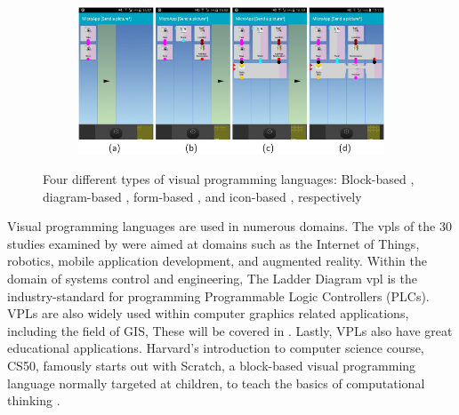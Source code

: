 \begin{figure}
\begin{subfigure}[c]{0.45\linewidth}
  \caption{}\label{fig:vpl-types:3}
\end{subfigure}%
\qquad %
\begin{subfigure}[d]{0.45\linewidth}
  \centering
  \graphicspath{{../../assets/images/background/vpl/}}
  \includegraphics[width=\linewidth]{icon-based.jpg}
  \caption{}\label{fig:vpl-types:4}
\end{subfigure}%
\caption[Types of \ac{vpl}s]{Four different types of visual programming languages: 
Block-based \citep{resnick_scratch_2009}, 
diagram-based \citep{blender_foundation_geometry_2022}, 
form-based \citep{weber_form-based_2013}, 
and icon-based \citep{francese_iconic_2017}, respectively}%
\label{fig:vpl-types}
\end{figure}

Visual programming languages are used in numerous domains. 
The vpls of the 30 studies examined by \citet{kuhail_characterizing_2021} were aimed at domains such as the Internet of Things, robotics, mobile application development, and augmented reality. 
Within the domain of systems control and engineering, The Ladder Diagram vpl \citep{control_automation_ladder_2018} is the industry-standard for programming Programmable Logic Controllers (PLCs).
\ac{VPL}s are also widely used within computer graphics related applications, including the field of \ac{GIS}, 
These will be covered in .
Lastly, \ac{VPL}s also have great educational applications. 
Harvard's introduction to computer science course, CS50, famously starts out with Scratch, a block-based visual programming language normally targeted at children, to teach the basics of computational thinking \citep{yu_cs50s_2021}. 

 

